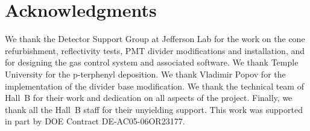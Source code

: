 \section{Acknowledgments}

We thank the Detector Support Group at Jefferson Lab for the work on the cone refurbishment, reflectivity tests,
PMT divider modifications and installation, and for designing the gas control system and associated software. We
thank Temple University for the p-terphenyl deposition. We thank Vladimir Popov for the implementation of the
divider base modification.  We thank the technical team of Hall~B for their work and dedication on all aspects of the
project. Finally, we thank all the Hall~B staff for their unyielding support. This work was supported in part by
DOE Contract DE-AC05-06OR23177.
